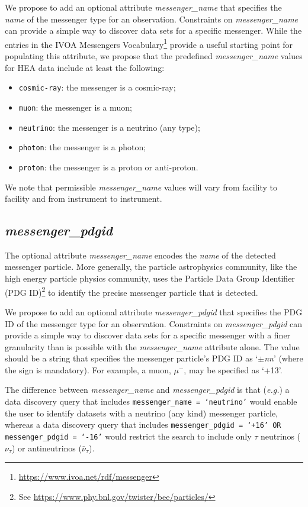 \documentclass[11pt,a4paper]{ivoa}
\begin{document}
We propose to add an optional attribute {\em messenger\_name\/} that specifies the {\em name} of the messenger type for an observation.  Constraints on {\em messenger\_name\/} can provide a simple way to discover data sets for a specific messenger.  While the entries in the IVOA Messengers Vocabulary\footnote{\url{https://www.ivoa.net/rdf/messenger}} provide a useful starting point for populating this attribute, we propose that the predefined {\em messenger\_name\/} values for \gls{HEA} data include at least the following:
\begin{itemize}
	\item \texttt{cosmic-ray}: the messenger is a cosmic-ray;
	\item \texttt{muon}: the messenger is a muon;
	\item \texttt{neutrino}: the messenger is a neutrino (any type);
	\item \texttt{photon}: the messenger is a photon;
	\item \texttt{proton}: the messenger is a proton or anti-proton.
\end{itemize}
We note that permissible {\em messenger\_name\/} values will vary from facility to facility and from instrument to instrument.

\subsection{{\em messenger\_pdgid}}
\label{sec:messenger_pdgid}

The optional attribute {\em messenger\_name\/} encodes the {\em name\/} of the detected messenger particle.  More generally, the particle astrophysics community, like the high energy particle physics community,  uses the Particle Data Group Identifier (PDG ID)\footnote{See \url{https://www.phy.bnl.gov/twister/bee/particles/}} to identify the precise messenger particle that is detected.

We propose to add an optional attribute {\em messenger\_pdgid\/} that specifies the PDG ID of the messenger type for an observation.  Constraints on {\em messenger\_pdgid\/} can provide a simple way to discover data sets for a specific messenger with a finer granularity than is possible with the {\em messenger\_name\/} attribute alone.  The value should be a string that specifies the messenger particle's PDG ID as `{\em $\pm$nn\/}' (where the sign is mandatory).  For example, a muon, $\mu^{-}$, may be specified as `+13'.

The difference between {\em messenger\_name\/} and {\em messenger\_pdgid} is that ({\em e.g.\/}\null) a data discovery query that includes {\tt messenger\_name = `neutrino'} would enable the user to identify datasets with a neutrino (any kind) messenger particle, whereas a data discovery query that includes {\tt messenger\_pdgid = `+16' OR messenger\_pdgid = `-16'} would restrict the search to include only $\tau$ neutrinos ($\nu_\tau$) or antineutrinos ($\bar\nu_\tau$).
\end{document}
